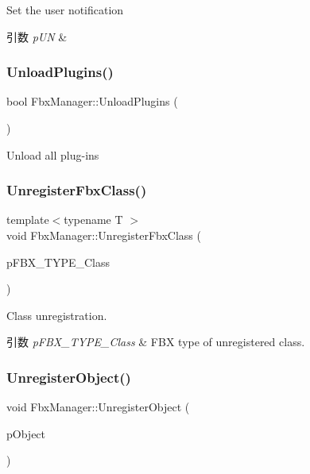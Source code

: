 Set the user notification 
\begin{DoxyParams}{引数}
{\em p\+UN} & \\
\hline
\end{DoxyParams}
\mbox{\label{class_fbx_manager_ac088e1b925b4576e9221f48533edee98}} 
\subsubsection{\texorpdfstring{Unload\+Plugins()}{UnloadPlugins()}}
{\footnotesize\ttfamily bool Fbx\+Manager\+::\+Unload\+Plugins (\begin{DoxyParamCaption}{ }\end{DoxyParamCaption})}

Unload all plug-\/ins \mbox{\label{class_fbx_manager_acaa996fbb60c38c9d015f18c91fa81be}} 
\subsubsection{\texorpdfstring{Unregister\+Fbx\+Class()}{UnregisterFbxClass()}}
{\footnotesize\ttfamily template$<$typename T $>$ \\
void Fbx\+Manager\+::\+Unregister\+Fbx\+Class (\begin{DoxyParamCaption}\item[{const T $\ast$}]{p\+F\+B\+X\+\_\+\+T\+Y\+P\+E\+\_\+\+Class }\end{DoxyParamCaption})}

Class unregistration. 
\begin{DoxyParams}{引数}
{\em p\+F\+B\+X\+\_\+\+T\+Y\+P\+E\+\_\+\+Class} & F\+BX type of unregistered class. \\
\hline
\end{DoxyParams}
\mbox{\label{class_fbx_manager_a489bd5a18d410b98fcfd87be401c9347}} 
\subsubsection{\texorpdfstring{Unregister\+Object()}{UnregisterObject()}}
{\footnotesize\ttfamily void Fbx\+Manager\+::\+Unregister\+Object (\begin{DoxyParamCaption}\item[{\hyperlink{class_fbx_object}{Fbx\+Object} $\ast$}]{p\+Object }\end{DoxyParamCaption})}

